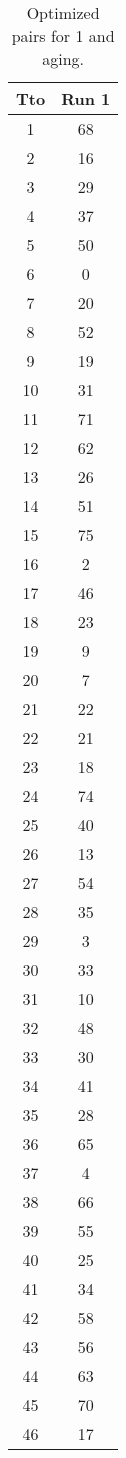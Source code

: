 \begin{table}
  \centering
  \scriptsize
  \caption{Optimized pairs for 1 and aging.}
  \label{tab_pairs}
\begin{tabular}{c c }
\hline
Tto & Run 1 \\
\hline
1 & 68 \\
2 & 16 \\
3 & 29 \\
4 & 37 \\
5 & 50 \\
6 & 0 \\
7 & 20 \\
8 & 52 \\
9 & 19 \\
10 & 31 \\
11 & 71 \\
12 & 62 \\
13 & 26 \\
14 & 51 \\
15 & 75 \\
16 & 2 \\
17 & 46 \\
18 & 23 \\
19 & 9 \\
20 & 7 \\
21 & 22 \\
22 & 21 \\
23 & 18 \\
24 & 74 \\
25 & 40 \\
26 & 13 \\
27 & 54 \\
28 & 35 \\
29 & 3 \\
30 & 33 \\
31 & 10 \\
32 & 48 \\
33 & 30 \\
34 & 41 \\
35 & 28 \\
36 & 65 \\
37 & 4 \\
38 & 66 \\
39 & 55 \\
40 & 25 \\
41 & 34 \\
42 & 58 \\
43 & 56 \\
44 & 63 \\
45 & 70 \\
46 & 17 \\

\end{tabular}
\end{table}
